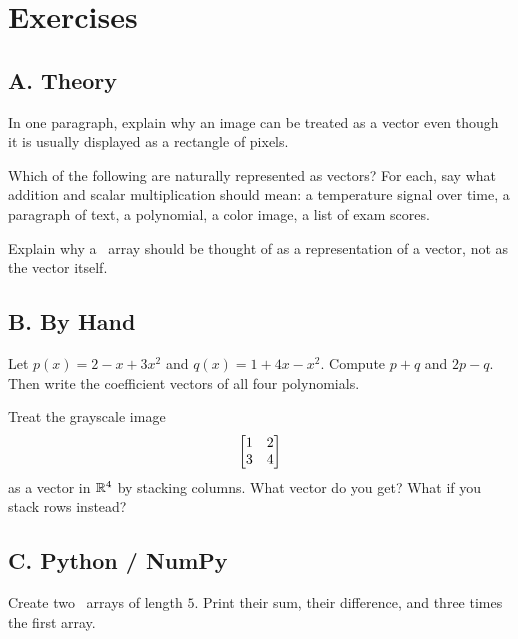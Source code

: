 \section*{Exercises}

\subsection*{A. Theory}

\begin{exercise}
In one paragraph, explain why an image can be treated as a vector even though
it is usually displayed as a rectangle of pixels.
\end{exercise}

\begin{exercise}
Which of the following are naturally represented as vectors? For each, say
what addition and scalar multiplication should mean: a temperature signal over
time, a paragraph of text, a polynomial, a color image, a list of exam scores.
\end{exercise}

\begin{exercise}
Explain why a \NumPy\ array should be thought of as a representation of a
vector, not as the vector itself.
\end{exercise}

\subsection*{B. By Hand}

\begin{exercise}
Let $p(x)=2-x+3x^2$ and $q(x)=1+4x-x^2$. Compute $p+q$ and $2p-q$.
Then write the coefficient vectors of all four polynomials.
\end{exercise}

\begin{exercise}
Treat the grayscale image
\[
  \begin{bmatrix}1&2\\3&4\end{bmatrix}
\]
as a vector in $\mathbb{R}^4$ by stacking columns. What vector do you get? What if you
stack rows instead?
\end{exercise}

\subsection*{C. Python / NumPy}

\begin{exercise}
Create two \NumPy\ arrays of length $5$. Print their sum, their difference,
and three times the first array.
\end{exercise}

